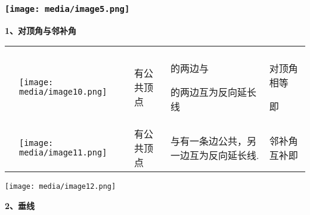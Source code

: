\documentclass[a4paper,11pt,UTF8]{ctexart}
\begin{document}
\hypertarget{ux5b66ux79d1ux7f51www.zxxk.com--ux6559ux80b2ux8d44ux6e90ux95e8ux6237ux63d0ux4f9bux8bd5ux9898ux8bd5ux5377ux6559ux6848ux8bfeux4ef6ux6559ux5b66ux8bbaux6587ux7d20ux6750ux7b49ux5404ux7c7bux6559ux5b66ux8d44ux6e90ux5e93ux4e0bux8f7dux8fd8ux6709ux5927ux91cfux4e30ux5bccux7684ux6559ux5b66ux8d44ux8baf-5}{%
\subsubsection{\texorpdfstring{\protect\texttt{[image: media/image5.png]}}{学科网(www.zxxk.com)-\/-教育资源门户，提供试题试卷、教案、课件、教学论文、素材等各类教学资源库下载，还有大量丰富的教学资讯！}}\label{ux5b66ux79d1ux7f51www.zxxk.com--ux6559ux80b2ux8d44ux6e90ux95e8ux6237ux63d0ux4f9bux8bd5ux9898ux8bd5ux5377ux6559ux6848ux8bfeux4ef6ux6559ux5b66ux8bbaux6587ux7d20ux6750ux7b49ux5404ux7c7bux6559ux5b66ux8d44ux6e90ux5e93ux4e0bux8f7dux8fd8ux6709ux5927ux91cfux4e30ux5bccux7684ux6559ux5b66ux8d44ux8baf-5}}

\textbf{1、对顶角与邻补角}

\begin{longtable}[]{@{}lllll@{}}
\toprule
\endhead
& & & &\tabularnewline
\begin{minipage}[t]{0.17\columnwidth}\raggedright
\strut
\end{minipage} & \begin{minipage}[t]{0.17\columnwidth}\raggedright
\texttt{[image: media/image10.png]}\strut
\end{minipage} & \begin{minipage}[t]{0.17\columnwidth}\raggedright
有公共顶点\strut
\end{minipage} & \begin{minipage}[t]{0.17\columnwidth}\raggedright
的两边与

的两边互为反向延长线\strut
\end{minipage} & \begin{minipage}[t]{0.17\columnwidth}\raggedright
对顶角相等

即\strut
\end{minipage}\tabularnewline
& \texttt{[image: media/image11.png]}
& 有公共顶点 & 与有一条边公共，另一边互为反向延长线. &
邻补角互补即\tabularnewline
\bottomrule
\end{longtable}

\texttt{[image: media/image12.png]}

\textbf{2、垂线}
\end{document}
